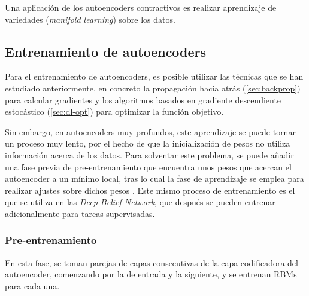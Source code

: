 Una aplicación de los autoencoders contractivos es realizar aprendizaje de variedades (\textit{manifold learning}) sobre los datos.


\subsection{Entrenamiento de
  autoencoders}\label{entrenamiento-de-autoencoders}

Para el entrenamiento de autoencoders, es posible utilizar las técnicas que se han estudiado anteriormente, en concreto la propagación hacia atrás (\autoref{sec:backprop}) para calcular gradientes y los algoritmos basados en gradiente descendiente estocástico (\autoref{sec:dl-opt}) para optimizar la función objetivo.

Sin embargo, en autoencoders muy profundos, este aprendizaje se puede tornar un proceso muy lento, por el hecho de que la inicialización de pesos no utiliza información acerca de los datos. Para solventar este problema, se puede añadir una fase previa de pre-entrenamiento que encuentra unos pesos que acercan el autoencoder a un mínimo local, tras lo cual la fase de aprendizaje se emplea para realizar ajustes sobre dichos pesos \autocite{hinton2006autoencoder}. Este mismo proceso de entrenamiento es el que se utiliza en las \textit{Deep Belief Network}, que después se pueden entrenar adicionalmente para tareas supervisadas.

\subsubsection{Pre-entrenamiento}\label{pre-entrenamiento}

En esta fase, se toman parejas de capas consecutivas de la capa codificadora del autoencoder, comenzando por la de entrada y la siguiente, y se entrenan RBMs para cada una.

